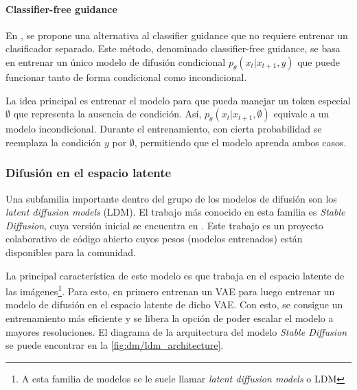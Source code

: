 \paragraph{Classifier-free guidance}

En \cite{ho2022classifierfreediffusionguidance}, se propone una alternativa al classifier guidance que no requiere entrenar un clasificador separado. Este método, denominado classifier-free guidance, se basa en entrenar un único modelo de difusión condicional $p_\theta(x_t|x_{t+1},y)$ que puede funcionar tanto de forma condicional como incondicional.

La idea principal es entrenar el modelo para que pueda manejar un token especial $\emptyset$ que representa la ausencia de condición. Así, $p_\theta(x_t|x_{t+1},\emptyset)$ equivale a un modelo incondicional. Durante el entrenamiento, con cierta probabilidad se reemplaza la condición $y$ por $\emptyset$, permitiendo que el modelo aprenda ambos casos.


\subsubsection{Difusión en el espacio latente}

Una subfamilia importante dentro del grupo de los modelos de difusión son los \textit{latent diffusion models} (LDM). El trabajo más conocido en esta familia es \textit{Stable Diffusion}, cuya versión inicial se encuentra en \cite{rombach2022highresolution}. Este trabajo es un proyecto colaborativo de código abierto cuyos pesos (modelos entrenados) están disponibles para la comunidad.

La principal característica de este modelo es que trabaja en el espacio latente de las imágenes\footnote{A esta familia de modelos se le suele llamar \textit{latent diffusion models} o LDM}. Para esto, en \cite{rombach2022highresolution} primero entrenan un VAE para luego entrenar un modelo de difusión en el espacio latente de dicho VAE. Con esto, se consigue un entrenamiento más eficiente y se libera la opción de poder escalar el modelo a mayores resoluciones. El diagrama de la arquitectura del modelo \textit{Stable Diffusion} se puede encontrar en la \autoref{fig:dm/ldm_architecture}.


